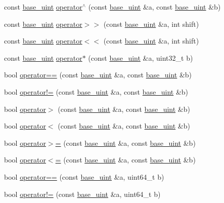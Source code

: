 \begin{DoxyCompactItemize}
\item 
const \mbox{\hyperlink{classbase__uint}{base\+\_\+uint}} \mbox{\hyperlink{classbase__uint_aa9c66282ad78846e8310984aeb2df49d}{operator$^\wedge$}} (const \mbox{\hyperlink{classbase__uint}{base\+\_\+uint}} \&a, const \mbox{\hyperlink{classbase__uint}{base\+\_\+uint}} \&b)
\item 
const \mbox{\hyperlink{classbase__uint}{base\+\_\+uint}} \mbox{\hyperlink{classbase__uint_a9d619adcbf9ad5539f5e98f739edd15d}{operator$>$$>$}} (const \mbox{\hyperlink{classbase__uint}{base\+\_\+uint}} \&a, int shift)
\item 
const \mbox{\hyperlink{classbase__uint}{base\+\_\+uint}} \mbox{\hyperlink{classbase__uint_acee16d973ae59087cd962720773f53dd}{operator$<$$<$}} (const \mbox{\hyperlink{classbase__uint}{base\+\_\+uint}} \&a, int shift)
\item 
const \mbox{\hyperlink{classbase__uint}{base\+\_\+uint}} \mbox{\hyperlink{classbase__uint_a3490f0aef12712d434cda33f913b586f}{operator$\ast$}} (const \mbox{\hyperlink{classbase__uint}{base\+\_\+uint}} \&a, uint32\+\_\+t b)
\item 
bool \mbox{\hyperlink{classbase__uint_aafca305decdfd2ded4688213ab4a55fa}{operator==}} (const \mbox{\hyperlink{classbase__uint}{base\+\_\+uint}} \&a, const \mbox{\hyperlink{classbase__uint}{base\+\_\+uint}} \&b)
\item 
bool \mbox{\hyperlink{classbase__uint_a3cc3bccf252004fbbd2b96dc769378e7}{operator!=}} (const \mbox{\hyperlink{classbase__uint}{base\+\_\+uint}} \&a, const \mbox{\hyperlink{classbase__uint}{base\+\_\+uint}} \&b)
\item 
bool \mbox{\hyperlink{classbase__uint_ac59719bd052d5dc2afcc35ae4a8843ab}{operator$>$}} (const \mbox{\hyperlink{classbase__uint}{base\+\_\+uint}} \&a, const \mbox{\hyperlink{classbase__uint}{base\+\_\+uint}} \&b)
\item 
bool \mbox{\hyperlink{classbase__uint_a89272b5112f90ba683c0f066ba1426c1}{operator$<$}} (const \mbox{\hyperlink{classbase__uint}{base\+\_\+uint}} \&a, const \mbox{\hyperlink{classbase__uint}{base\+\_\+uint}} \&b)
\item 
bool \mbox{\hyperlink{classbase__uint_a9eb243df5a6dfa3d0cd326427d99bfa6}{operator$>$=}} (const \mbox{\hyperlink{classbase__uint}{base\+\_\+uint}} \&a, const \mbox{\hyperlink{classbase__uint}{base\+\_\+uint}} \&b)
\item 
bool \mbox{\hyperlink{classbase__uint_ac7f1bdba7208bd852f7b00f7c49624f8}{operator$<$=}} (const \mbox{\hyperlink{classbase__uint}{base\+\_\+uint}} \&a, const \mbox{\hyperlink{classbase__uint}{base\+\_\+uint}} \&b)
\item 
bool \mbox{\hyperlink{classbase__uint_a977dbbe7e78bbdcc2aea2dc16292d424}{operator==}} (const \mbox{\hyperlink{classbase__uint}{base\+\_\+uint}} \&a, uint64\+\_\+t b)
\item 
bool \mbox{\hyperlink{classbase__uint_ab7b366cc0883f25fa57fb09d4bc33807}{operator!=}} (const \mbox{\hyperlink{classbase__uint}{base\+\_\+uint}} \&a, uint64\+\_\+t b)
\end{DoxyCompactItemize}


